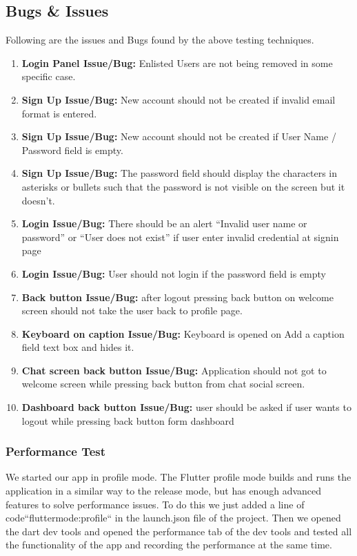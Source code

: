 \subsection{Bugs \& Issues}
Following are the issues and Bugs found by the above testing techniques.
\begin{enumerate}
    \item \textbf{Login Panel Issue/Bug:} Enlisted Users are not being removed in some specific case.
    \item \textbf{Sign Up Issue/Bug:} New account should not be created if invalid email format is entered.
    \item \textbf{Sign Up Issue/Bug:} New account should not be created if User Name / Password field is empty.
    \item \textbf{Sign Up Issue/Bug:} The password field should display the characters in asterisks or bullets such that the password is not visible on the screen but it doesn't.
    \item \textbf{Login Issue/Bug:} There should be an alert “Invalid user name or password” or “User does not exist” if user enter invalid credential at signin page
    \item \textbf{Login Issue/Bug:} User should not login if the password field is empty
    \item \textbf{Back button Issue/Bug:} after logout pressing back button on welcome screen should not take the user back to profile page.
    \item \textbf{Keyboard on caption Issue/Bug:} Keyboard is opened on Add a caption field text box and hides it.
    \item \textbf{Chat screen back button Issue/Bug:} Application should not got to welcome screen while pressing back button from chat social screen.
    \item \textbf{Dashboard back button Issue/Bug:} user should be asked if user wants to logout while pressing back button form dashboard
\end{enumerate}
\subsubsection{Performance Test}
We started our app in profile mode. The Flutter profile mode builds and runs the application in a similar way to the release mode, but has enough advanced features to solve performance issues. To do this we just added a line of code``fluttermode:profile`` in the launch.json file of the project. Then we opened the dart dev tools and opened the performance tab of the dev tools and tested all the functionality of the app and recording the performance at the same time. 

